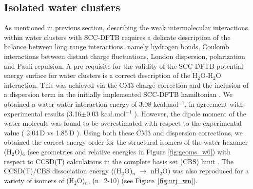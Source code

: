 \documentclass[]{interact}
\theoremstyle{plain}%
\theoremstyle{definition}
\theoremstyle{remark}
\begin{document}
\subsection{Isolated water clusters}  \label{bare_water}
As mentioned in previous section, describing the weak intermolecular interactions within water clusters with SCC-DFTB  requires a delicate description of the balance between long range interactions, namely hydrogen bonds, Coulomb interactions between distant charge fluctuations, London dispersion, polarization and Pauli repulsion. A pre-requisite
for the validity of the SCC-DFTB potential energy surface
for water clusters is a correct description of the H$_2$O-H$_2$O interaction.  This was achieved via the CM3 charge correction and the inclusion of a dispersion  term in the initially implemented SCC-DFTB hamiltonian \cite{SimonPCCP2012}. We obtained a water-water interaction energy of 3.08 kcal.mol$^{-1}$, in agreement with experimental results (3.16$\pm$0.03 kcal.mol$^{-1}$ \cite{Rocher2011}). However, the dipole moment of the water molecule was found to be overestimated with respect to the experimental value ( 2.04\,D vs 1.85\,D \cite{Dyke1973}). Using both these CM3 and dispersion corrections, we obtained the correct energy order for the structural isomers of the water hexamer (H$_2$O)$_6$ (see geometries and relative energies in Figure \ref{fig:geoms_w6}) with respect to CCSD(T) calculations in the complete basis set (CBS)  limit \cite{SimonJCP2013}. The CCSD(T)/CBS dissociation energy ((H$_2$O)$_n$ $\rightarrow$ nH$_2$O) was also reproduced for a variety of isomers of (H$_2$O)$_n$, (n=2-10) (see Figure~\ref{fig:nrj_wn}).
	
\end{document}
